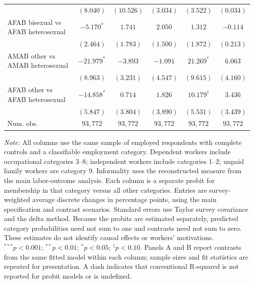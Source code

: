 \begin{table}[htpb!]
{\begin{tabular}{l c c c c c}
 & $(8.040)$ & $(10.526)$ & $(3.034)$ & $(3.522)$ & $(0.034)$ \\
AFAB bisexual vs AFAB heterosexual & $-5.170^{*}$ & $1.741$ & $2.050$ & $1.312$ & $-0.114$ \\
 & $(2.464)$ & $(1.783)$ & $(1.500)$ & $(1.872)$ & $(0.213)$ \\
AMAB other vs AMAB heterosexual & $-21.979^{*}$ & $-3.893$ & $-1.091$ & $21.269^{*}$ & $6.063$ \\
 & $(8.963)$ & $(3.231)$ & $(4.547)$ & $(9.615)$ & $(4.160)$ \\
AFAB other vs AFAB heterosexual & $-14.858^{*}$ & $0.714$ & $1.826$ & $10.179^{\dagger}$ & $3.436$ \\
 & $(5.847)$ & $(3.804)$ & $(3.890)$ & $(5.531)$ & $(3.439)$ \\
\hline
Num. obs. & $93,772$ & $93,772$ & $93,772$ & $93,772$ & $93,772$ \\
\hline
\end{tabular}%
}
\par\vspace{1ex}
\begin{minipage}{\textwidth}\footnotesize\raggedright
\textit{Note:} All columns use the same sample of employed respondents with complete controls and a classifiable employment category. Dependent workers include occupational categories 3--8; independent workers include categories 1--2; unpaid family workers are category 9. Informality uses the reconstructed measure from the main labor-outcome analysis. Each column is a separate probit for membership in that category versus all other categories. Entries are survey-weighted average discrete changes in percentage points, using the main specification and contrast scenarios. Standard errors use Taylor survey covariance and the delta method. Because the probits are estimated separately, predicted category probabilities need not sum to one and contrasts need not sum to zero. These estimates do not identify causal effects or workers' motivations. $^{***}p<0.001$; $^{**}p<0.01$; $^{*}p<0.05$; $^{\dagger}p<0.10$. Panels A and B report contrasts from the same fitted model within each column; sample sizes and fit statistics are repeated for presentation. A dash indicates that conventional R-squared is not reported for probit models or is undefined.
\end{minipage}
\end{table}
